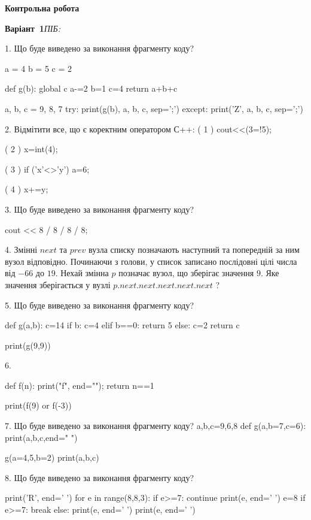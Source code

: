 \documentclass[11pt]{article}
\begin{document}
{\large\textbf{Контрольна робота}}

\textbf{Варіант \No\,1}\hfill \textit{ПІБ:}\,\underline{\hspace{60mm}}
\vspace{4mm}

1. Що буде виведено за виконання фрагменту коду?

a = 4
b = 5
c = 2

def g(b):
global c    a-=2
    b=1
    c=4
    return a+b+c

a, b, c = 9, 8, 7
try:
    print(g(b), a, b, c, sep=';')
except:
    print('Z', a, b, c, sep=';')

2. %
Відмітити все, що є коректним оператором С++:
( 1 ) cout<<(3=!5);

( 2 ) x=int(4);

( 3 ) if ('x'<>'y') a=6;

( 4 ) x+=y;

3. Що буде виведено за виконання фрагменту коду?

cout << 8 / 8 / 8 / 8;

4. 
Змінні $next$ та $prev$ вузла списку позначають наступний та попередній за ним вузол відповідно. Починаючи з голови, у список записано послідовні цілі числа від $-66$ до $19$. Нехай змінна $p$ позначає вузол, що зберігає значення $9$.
Яке значення зберігається у вузлі $p.next.next.next.next.next$ ?

5. Що буде виведено за виконання фрагменту коду?

def g(a,b):
    c=14
    if b:
        c=4
    elif b==0:
         return 5
    else: 
        c=2
    return c

print(g(9,9))

6. 

def f(n):
    print("f", end="");
    return n==1

print(f(9) or f(-3))

7. Що буде виведено за виконання фрагменту коду?
a,b,c=9,6,8
def g(a,b=7,c=6):
    print(a,b,c,end=" ")

g(a=4,5,b=2)
print(a,b,c)

8. Що буде виведено за виконання фрагменту коду?

print('R', end=' ')
for e in range(8,8,3):
    if e>=7:
        continue
        print(e, end=' ')
        e=8
    if e>=7:
        break
    else:
        print(e, end=' ')
    print(e, end=' ')
\end{document}
